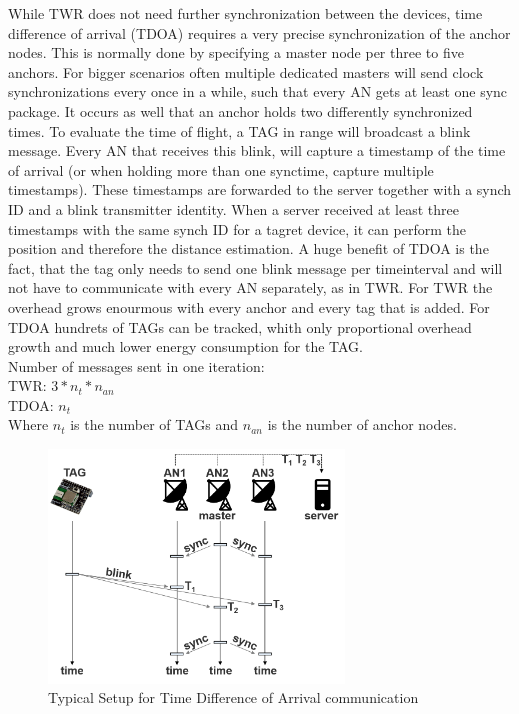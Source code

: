 While TWR does not need further synchronization between the devices, time difference of arrival (TDOA) requires a very precise synchronization of the anchor nodes. This is normally done by specifying a master node per three to five anchors. For bigger scenarios often multiple dedicated masters will send clock synchronizations every once in a while, such that every AN gets at least one sync package. It occurs as well that an anchor holds two differently synchronized times.
To evaluate the time of flight, a TAG in range will broadcast a blink message. Every AN that receives this blink, will capture a timestamp of the time of arrival (or when holding more than one synctime, capture multiple timestamps). These timestamps are forwarded to the server together with a synch ID and a blink transmitter identity. When a server received at least three timestamps with the same synch ID for a tagret device, it can perform the position and therefore the distance estimation.
A huge benefit of TDOA is the fact, that the tag only needs to send one blink message per timeinterval and will not have to communicate with every AN separately, as in TWR. For TWR the overhead grows enourmous with every anchor and every tag that is added. For TDOA hundrets of TAGs can be tracked, whith only proportional overhead growth and much lower energy consumption for the TAG.\\
Number of messages sent in one iteration:\\
TWR:  $3 * n_{t} * n_{an}$\\
TDOA:  $n_{t}$\\
Where $n_{t}$ is the number of TAGs and $n_{an}$ is the number of anchor nodes.
\cite{SewioTDOA}

\begin{figure}[th]
\centering
\includegraphics[width=0.7\textwidth]{Figures/time_difference_of_arrival}
\decoRule
\caption[Time Difference of Arrival]{Typical Setup for Time Difference of Arrival communication}
\label{fig:time_difference_of_arrival}
\end{figure}


